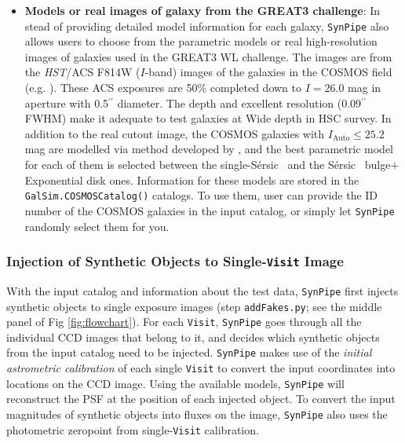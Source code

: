 \documentclass[useamsfonts]{pasj01}
\def\asec{$^{\prime\prime}$}
\def\ser{{S\'{e}rsic\ }}
\def\synpipe{\texttt{SynPipe}}
\def\visit{\texttt{Visit}}
\def\hst{{\textit{HST}}}
\begin{document}
\begin{itemize}
        \item \textbf{Models or real images of galaxy from the GREAT3 challenge}: 
            In stead of providing detailed model information for each galaxy, \synpipe{}
            also allows users to choose from the parametric models or real 
            high-resolution images of galaxies used in the GREAT3 WL challenge. 
            The images are from the \hst{}/ACS F814W ($I$-band) images of the galaxies 
            in the COSMOS field (e.g. \citealt{Scoville2007}). 
            These ACS exposures are 50\% completed down to $I=26.0$ mag in aperture with 
            0.5\asec{} diameter.  
            The depth and excellent resolution (0.09\asec FWHM) make it adequate to test 
            galaxies at Wide depth in HSC survey.
            In addition to the real cutout image, the COSMOS galaxies with 
            $I_{\mathrm{Auto}}\leq25.2$ mag are modelled via method developed by
            \citet{Lackner2012}, and the best parametric model for each of them is 
            selected between the single-\ser{} and the \ser{} bulge$+$Exponential disk 
            ones. 
            Information for these models are stored in the 
            \texttt{GalSim.COSMOSCatalog()} catalogs. 
            To use them, user can provide the ID number of the COSMOS galaxies in the 
            input catalog, or simply let \synpipe{} randomly select them for you.
                
    \end{itemize}
      
\subsubsection{Injection of Synthetic Objects to Single-\visit{} Image}
    \label{sssec:addFakes}
    
    With the input catalog and information about the test data, \synpipe{} first 
    injects synthetic objects to single exposure images (step \texttt{addFakes.py}; 
    see the middle panel of Fig \ref{fig:flowchart}). 
    For each \visit{}, \synpipe{} goes through all the individual CCD images 
    that belong to it, and decides which synthetic objects from the input catalog need
    to be injected. 
    \synpipe{} makes use of the \textit{initial astrometric calibration} of each single 
    \visit{} to convert the input coordinates into locations on the CCD image. 
    Using the available models, \synpipe{} will reconstruct the PSF at the position of 
    each injected object.
    To convert the input magnitudes of synthetic objects into fluxes on the image, 
    \synpipe{} also uses the photometric zeropoint from single-\visit{} 
    calibration.
     
\end{document}
